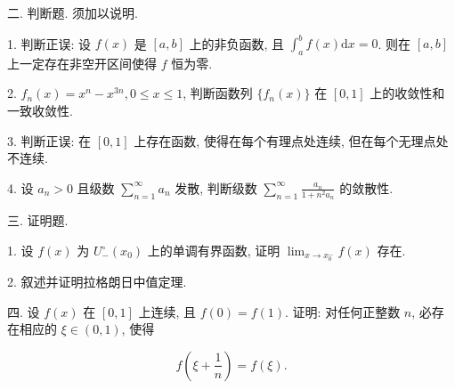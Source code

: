 \documentclass{examcollection}
\renewcommand{\displayformula}[1]{\[#1\]}
\begin{document}
{\begin{minipage}{\textwidth}
二. 判断题. 须加以说明.\par
1. 判断正误: 设 $f(x)$ 是 $[a, b]$ 上的非负函数, 且 $\int_{a}^{b} f(x) \mathrm{d}x = 0$. 则在 $[a, b]$ 上一定存在非空开区间使得 $f$ 恒为零.\par
2. $f_{n}(x) = x^{n} - x^{3n}, 0 \leq x \leq 1$, 判断函数列 $\{f_{n}(x)\}$ 在 $[0,1]$ 上的收敛性和一致收敛性.\par
3. 判断正误: 在 $[0,1]$ 上存在函数, 使得在每个有理点处连续, 但在每个无理点处不连续.\par
4. 设 $a_{n} > 0$ 且级数 $\sum_{n=1}^{\infty} a_{n}$ 发散, 判断级数 $\sum_{n=1}^{\infty} \frac{a_{n}}{1 + n^{2} a_{n}}$ 的敛散性.\par
三. 证明题.\par
1. 设 $f(x)$ 为 $U_{-}^{\circ}(x_0)$ 上的单调有界函数, 证明 $\lim_{x \to x_0^{-}} f(x)$ 存在.\par
2. 叙述并证明拉格朗日中值定理.\par
四. 设 $f(x)$ 在 $[0,1]$ 上连续, 且 $f(0) = f(1)$. 证明: 对任何正整数 $n$, 必存在相应的 $\xi \in (0,1)$, 使得\par
\displayformula{f \left(\xi + \frac {1}{n}\right) = f (\xi).}\par
\end{minipage}}
\ifdim\dimexpr\ht\proofbox+\dp\proofbox\relax>\textheight
\noindent\resizebox{!}{\textheight}{\usebox{\proofbox}}\else\noindent\usebox{\proofbox}\fi\clearpage
\end{document}
